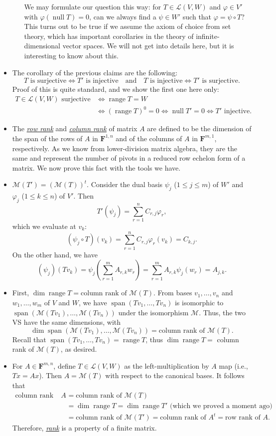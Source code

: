 \documentclass[11pt]{article}
\newcommand{\df}[1]{\ul{\textit{\textsf{#1}}}}
\newcommand{\F}{\mathbf{F}}
\newcommand{\s}{\operatorname{span}}
\newcommand{\n}{\operatorname{null}}
\renewcommand{\r}{\operatorname{range}}
\renewcommand{\d}{\dim}
\newcommand{\LVW}{\mathcal{L}(V,W)}
\newcommand{\M}{\mathcal{M}}
\newcommand{\bv}{v_1,\dots,v_n}
\renewcommand{\phi}{\varphi}
\begin{document}
\begin{itemize}
\begin{itemize}
        We may formulate our question this way: for $T \in \LVW$ and $\phi \in V'$ with $\phi(\n T) = 0$, can we always find a $\psi \in W'$ such that $\phi = \psi \circ T$? This turns out to be true if we assume the axiom of choice from set theory, which has important corollaries in the theory of infinite-dimensional vector spaces. We will not get into details here, but it is interesting to know about this.
    \end{itemize}
    \item The corollary of the previous claims are the following:
    $$T \text{ is surjective} \iff T' \text{ is injective} \quad \text{and} \quad T \text{ is injective} \iff T' \text{ is surjective}.$$ Proof of this is quite standard, and we show the first one here only: 
    \begin{align*}
        T \in \LVW \text{ surjective} & \iff \r T = W \\ & \iff (\r T)^0 = {0} \iff \n T' = {0} \iff T' \text{ injective}.
    \end{align*}
    \item The \df{row rank} and \df{column rank} of matrix $A$ are defined to be the dimension of the span of the rows of $A$ in $\F^{1,n}$ and of the columns of $A$ in $\F^{m,1}$, respectively. As we know from lower-division matrix algebra, they are the same and represent the number of pivots in a reduced row echelon form of a matrix. We now prove this fact with the tools we have.
    
    \item $\M(T') = (\M(T))^t$. Consider the dual basis $\psi_j$ ($1 \leq j \leq m$) of $W'$ and $\phi_j$ ($1 \leq k \leq n$) of $V'$. Then $$T'(\psi_j) = \sum_{r=1}^n C_{r,j}\phi_r,$$ which we evaluate at $v_k$: $$(\psi_j \circ T)(v_k) = \sum_{r=1}^n C_{r,j}\phi_r(v_k) = C_{k,j}.$$ On the other hand, we have $$(\psi_j)(Tv_k) = \psi_j\left(\sum_{r=1}^mA_{r,k}w_r\right) = \sum_{r=1}^m A_{r,k}\psi_j(w_r) = A_{j,k}.$$
    
    \item First, $\d \r T = \text{column rank of } \M(T)$. From bases $\bv$ and $w_1,\dots,w_m$ of $V$ and $W$, we have $\s(Tv_1,\dots,Tv_n)$ is isomorphic to $\s(\M(Tv_1),\dots,\M(Tv_n))$ under the isomorphism $\M$. Thus, the two VS have the same dimensions, with \[\d \s(\M(Tv_1),\dots,\M(Tv_n)) = \text{column rank of } \M(T).\] Recall that $\s(Tv_1,\dots,Tv_n) = \r T$, thus $\d \r T = $ column rank of $\M(T)$, as desired.
    
    \item For $A \in \F^{m,n}$, define $T \in \LVW$ as the left-multiplication by $A$ map (i.e., $Tx = Ax$). Then $A = \M(T)$ with respect to the canonical bases. It follows that
    \begin{align*}
        \text{column rank of } A & = \text{column rank of } \M(T) \\
        & = \d \r T = \d \r T' \text{ (which we proved a moment ago)} \\
        & = \text{column rank of } \M(T') = \text{column rank of } A^t
        = \text{row rank of } A.
    \end{align*}
    Therefore, \df{rank} is a property of a finite matrix.
\end{itemize}
\end{document}
